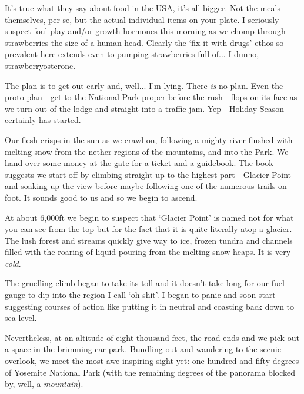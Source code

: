 \documentclass[a5paper,titlepage,11pt]{book}
\begin{document}
It's true what they say about food in the USA, it's all bigger. Not the meals themselves, per se, but the actual individual items on your plate. I seriously suspect foul play and/or growth hormones this morning as we chomp through strawberries the size of a human head. Clearly the `fix-it-with-drugs' ethos so prevalent here extends even to pumping strawberries full of... I dunno, strawberryosterone.

The plan is to get out early and, well... I'm lying. There \emph{is} no plan. Even the proto-plan - get to the National Park proper before the rush - flops on its face as we turn out of the lodge and straight into a traffic jam. Yep - Holiday Season certainly has started.

Our flesh crisps in the sun as we crawl on, following a mighty river flushed with melting snow from the nether regions of the mountains, and into the Park. We hand over some money at the gate for a ticket and a guidebook. The book suggests we start off by climbing straight up to the highest part - Glacier Point - and soaking up the view before maybe following one of the numerous trails on foot. It sounds good to us and so we begin to ascend.

At about 6,000ft we begin to suspect that `Glacier Point' is named not for what you can see from the top but for the fact that it is quite literally atop a glacier. The lush forest and streams quickly give way to ice, frozen tundra and channels filled with the roaring of liquid pouring from the melting snow heaps. It is very \emph{cold}.

The gruelling climb began to take its toll and it doesn't take long for our fuel gauge to dip into the region I call `oh shit'. I began to panic and soon start suggesting courses of action like putting it in neutral and coasting back down to sea level.

Nevertheless, at an altitude of eight thousand feet, the road ends and we pick out a space in the brimming car park. Bundling out and wandering to the scenic overlook, we meet the most awe-inspiring sight yet: one hundred and fifty degrees of Yosemite National Park (with the remaining degrees of the panorama blocked by, well, a \emph{mountain}).
\end{document}
